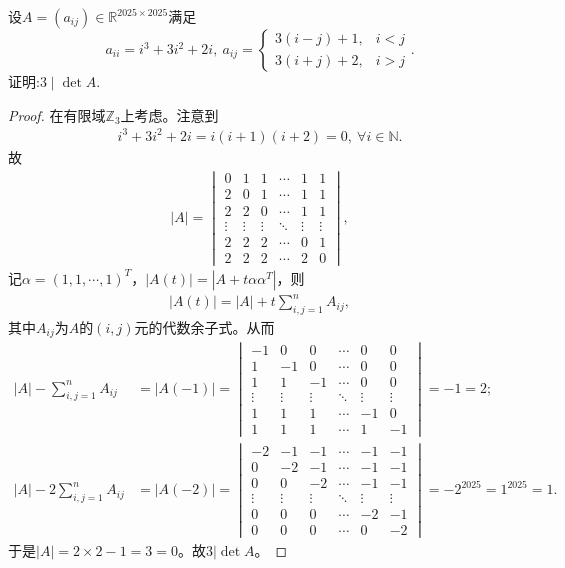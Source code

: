 \documentclass[../../main.tex]{subfiles}%
\begin{document}
\begin{example}
设$A = (a_{ij}) \in \mathbb{R}^{2025 \times 2025}$满足
\[
a_{ii} = i^3 + 3i^2 + 2i, \ a_{ij} = \begin{cases}
3(i - j) + 1, & i < j \\
3(i + j) + 2, & i > j
\end{cases}.
\]
证明:$3 \mid \det A$.
\end{example}
\begin{proof}

在有限域$\mathbb{Z}_3$上考虑。注意到
\begin{align*}
i^3+3i^2+2i=i(i+1)(i+2)=0,\ \forall i\in\mathbb{N}.
\end{align*}
故
\begin{align*}
|A|=\begin{vmatrix}
0&1&1&\cdots&1&1\\
2&0&1&\cdots&1&1\\
2&2&0&\cdots&1&1\\
\vdots&\vdots&\vdots&\ddots&\vdots&\vdots\\
2&2&2&\cdots&0&1\\
2&2&2&\cdots&2&0
\end{vmatrix},
\end{align*}
记$\alpha=(1,1,\cdots,1)^T$，$|A(t)|=|A+t\alpha\alpha^T|$，则
\begin{align*}
|A(t)|=|A|+t\sum_{i,j=1}^n A_{ij},
\end{align*}
其中$A_{ij}$为$A$的$(i,j)$元的代数余子式。从而
\begin{align*}
|A|-\sum_{i,j=1}^n A_{ij}&=|A(-1)|=\begin{vmatrix}
-1&0&0&\cdots&0&0\\
1&-1&0&\cdots&0&0\\
1&1&-1&\cdots&0&0\\
\vdots&\vdots&\vdots&\ddots&\vdots&\vdots\\
1&1&1&\cdots&-1&0\\
1&1&1&\cdots&1&-1
\end{vmatrix}=-1=2;\\
|A|-2\sum_{i,j=1}^n A_{ij}&=|A(-2)|=\begin{vmatrix}
-2&-1&-1&\cdots&-1&-1\\
0&-2&-1&\cdots&-1&-1\\
0&0&-2&\cdots&-1&-1\\
\vdots&\vdots&\vdots&\ddots&\vdots&\vdots\\
0&0&0&\cdots&-2&-1\\
0&0&0&\cdots&0&-2
\end{vmatrix}=-2^{2025}=1^{2025}=1.
\end{align*}
于是$|A|=2\times 2-1=3=0$。故$3|\det A$。


\end{proof}
\end{document}
